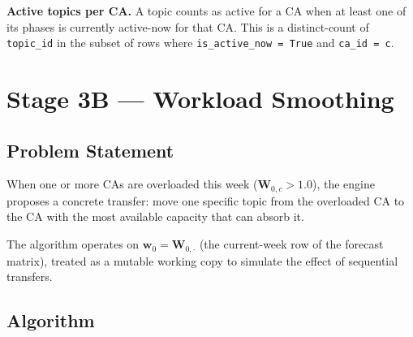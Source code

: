 \documentclass[12pt,a4paper]{report}
\begin{document}
\textbf{Active topics per CA.}
A topic counts as active for a CA when at least one of its phases is
currently active-now for that CA. This is a distinct-count of
\texttt{topic\_id} in the subset of rows where \texttt{is\_active\_now =
True} and \texttt{ca\_id = c}.

\section{Stage 3B --- Workload Smoothing}
\label{sec:smoothing}

\subsection{Problem Statement}

When one or more CAs are overloaded this week
($\mathbf{W}_{0,c} > 1.0$), the engine proposes a concrete transfer:
move one specific topic from the overloaded CA to the CA with the
most available capacity that can absorb it.

The algorithm operates on $\mathbf{w}_0 = \mathbf{W}_{0,\cdot}$
(the current-week row of the forecast matrix), treated as a mutable
working copy to simulate the effect of sequential transfers.

\subsection{Algorithm}
\end{document}
